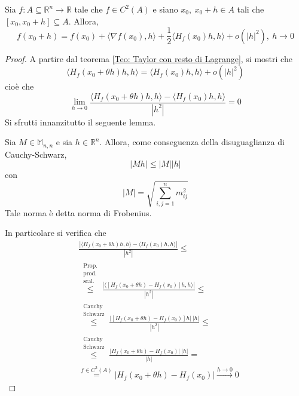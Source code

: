 \begin{theorem} \label{Teo: Taylor con resto di Peano}
    Sia $f: A \subseteq \mathbb{R}^n \to \mathbb{R}$ tale che $f \in C^2(A)$ e siano $x_0,\ x_0+h \in A$ tali che $[x_0, x_0+h] \subseteq A$. Allora, 
    \begin{equation}
        f(x_0+h)=f(x_0)+\langle \nabla f(x_0), h \rangle+ \frac{1}{2} \langle H_f(x_0)h, h\rangle + o(|h|^2),\ h \to 0 \label{Eq: Taylor con resto di Peano}
    \end{equation}
    \begin{proof}
        A partire dal teorema \ref{Teo: Taylor con resto di Lagrange}, si mostri che 
        \begin{equation}
            \langle H_f(x_0+\theta h)h, h \rangle = \langle H_f(x_0)h,h \rangle + o(|h|^2)
        \end{equation}
        cioè che 
        \begin{equation}
            \lim_{h\to 0}{\frac{\langle H_f(x_0+\theta h)h, h \rangle - \langle H_f(x_0)h, h \rangle}{|h^2|}}=0
        \end{equation}
        Si sfrutti innanzitutto il seguente lemma.
        \begin{lemma}
            Sia $M \in \mathbb{M}_{n,n}$ e sia $h \in \mathbb{R}^n$. Allora, come conseguenza della disuguaglianza di Cauchy-Schwarz, 
            \begin{equation}
                |Mh| \leq |M| |h|
            \end{equation}
            con 
            \begin{equation} \label{Eq: Norma di Frobenius}
                |M|=\sqrt{\sum\limits_{i,j=1}^{n}{m_{ij}^2}}
            \end{equation}
            Tale norma è detta norma di Frobenius.
        \end{lemma}
        In particolare si verifica che
        \begin{equation}
            \begin{aligned}
                &\frac{|\langle H_f(x_0+\theta h)h, h \rangle - \langle H_f(x_0)h, h\rangle|}{|h^2|}\leq\\
                &\overset{\substack{\text{Prop.}\\\text{prod.}\\ \text{scal.}}}{\leq}\frac{|\langle [H_f(x_0+\theta h)-H_f(x_0)]h, h \rangle|}{|h^2|} \leq\\
                &\overset{\substack{\text{Cauchy}\\\text{Schwarz}}}{\leq} \frac{|[H_f(x_0+\theta h)-H_f(x_0)]h|\ |h|}{|h^2|} \leq\\
                &\overset{\substack{\text{Cauchy}\\\text{Schwarz}}}{\leq} \frac{|H_f(x_0+\theta h)-H_f(x_0)|\ |h|}{|h|} =\\
                &\overset{f \in C^2(A)}{=}|H_f(x_0+\theta h)-H_f(x_0)| \overset{h \to 0}{\to} 0
            \end{aligned}
        \end{equation}
    \end{proof}
\end{theorem}
